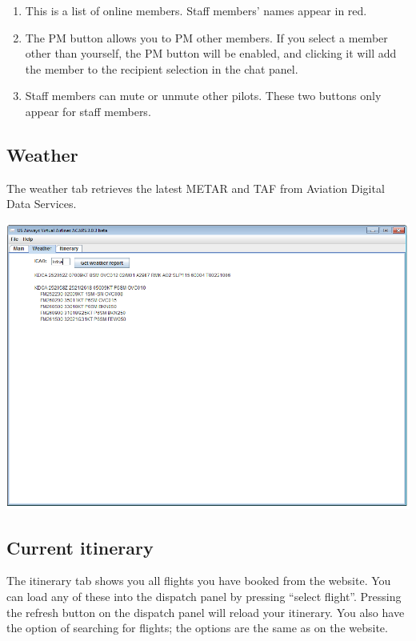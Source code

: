 \documentclass[12pt]{article}
\begin{document}
\begin{enumerate}
\item{This is a list of online members. Staff members’ names appear in red.}

\item{The PM button allows you to PM other members. If you select a member other than yourself, the PM button will be enabled, and clicking it will add the member to the recipient selection in the chat panel.}

\item{Staff members can mute or unmute other pilots. These two buttons only appear for staff members.}
\end{enumerate}

\subsection{Weather}
The weather tab retrieves the latest METAR and TAF from Aviation Digital Data Services.

\begin{center}
\includegraphics[scale=1]{Image11.pdf}
\end{center} 

\subsection{Current itinerary}
The itinerary tab shows you all flights you have booked from the website. You can load any of these into the dispatch panel by pressing “select flight”. Pressing the refresh button on the dispatch panel will reload your itinerary. You also have the option of searching for flights; the options are the same as on the website.
\end{document}
